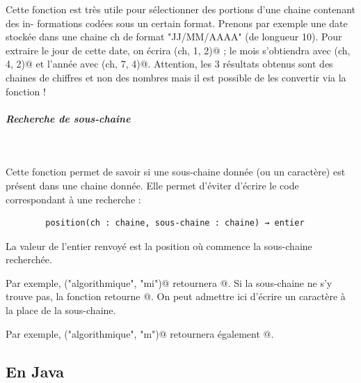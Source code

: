 \documentclass[11pt,a4paper]{article}
\begin{document}
            \par
        
        Cette fonction est tr\`es utile pour s\'electionner des portions d'une chaine contenant des in-
        formations cod\'ees sous un certain format. Prenons par exemple une date stock\'ee dans une
        chaine ch de format "JJ/MM/AAAA" (de longueur 10). Pour extraire le jour de cette date,
        on \'ecrira \verb@sousChaine(ch, 1, 2)@ ; 
        le mois s'obtiendra avec \verb@sousChaine(ch, 4, 2)@ et l'ann\'ee avec
        \verb@sousChaine(ch, 7, 4)@. 
        Attention, les 3 r\'esultats obtenus sont des chaines de chiffres et non
        des nombres mais il est possible de les convertir via la fonction 
        \verb@nombre@ !
      
            \par
        
			
		\subparagraph{Recherche de sous-chaine} 
		
					\textcolor{white}{.} \par
				
        Cette fonction permet de savoir si une sous-chaine donn\'ee (ou un caract\`ere) est pr\'esent dans
        une chaine donn\'ee. Elle permet d'\'eviter d'\'ecrire le code correspondant \`a une recherche :
      
            \par
        \begin{verbatim}
        position(ch : chaine, sous-chaine : chaine) → entier
      \end{verbatim}
        La valeur de l'entier renvoy\'e est la position o\`u commence la sous-chaine recherch\'ee. 
      
            \par
        
        Par exemple, \verb@position("algorithmique", "mi")@ 
        retournera @. Si la sous-chaine ne s'y trouve
        pas, la fonction retourne @. 
        On peut admettre ici d'\'ecrire un caract\`ere \`a la place de la sous-chaine. 
      
            \par
        
        Par exemple, \verb@position("algorithmique", "m")@ 
        retournera \'egalement @.
      
            \par
        \subsection{En Java}
			
\end{document}
